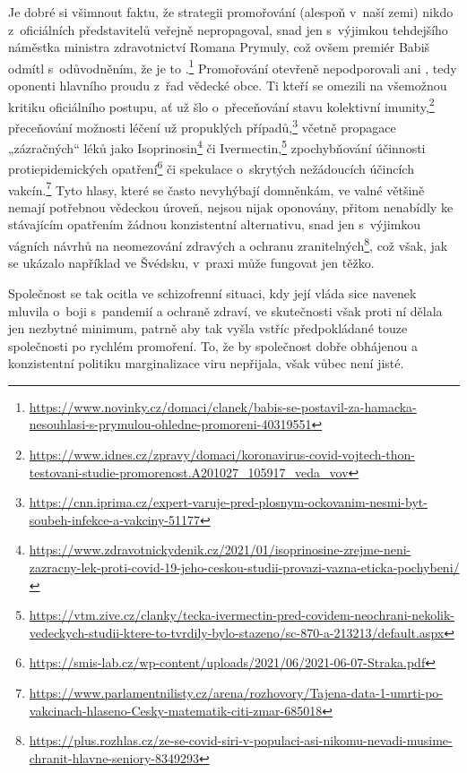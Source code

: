 Je dobré si všimnout faktu, že strategii promořování (alespoň v~naší zemi) nikdo z~oficiálních představitelů veřejně nepropagoval, snad jen s~výjimkou tehdejšího náměstka ministra zdravotnictví Romana Prymuly, což ovšem premiér Babiš odmítl s~odůvodněním, že je to .\footnote{\url{https://www.novinky.cz/domaci/clanek/babis-se-postavil-za-hamacka-nesouhlasi-s-prymulou-ohledne-promoreni-40319551}} Promořování otevřeně nepodporovali ani , tedy oponenti hlavního proudu z~řad vědecké obce. Ti kteří se omezili na všemožnou kritiku oficiálního postupu, ať už šlo o~přeceňování stavu kolektivní imunity,\footnote{\url{https://www.idnes.cz/zpravy/domaci/koronavirus-covid-vojtech-thon-testovani-studie-promorenost.A201027_105917_veda_vov}} přeceňování možnosti léčení už propuklých případů,\footnote{\url{https://cnn.iprima.cz/expert-varuje-pred-plosnym-ockovanim-nesmi-byt-soubeh-infekce-a-vakciny-51177}} včetně propagace „zázračných“ léků jako Isoprinosin\footnote{\url{https://www.zdravotnickydenik.cz/2021/01/isoprinosine-zrejme-neni-zazracny-lek-proti-covid-19-jeho-ceskou-studii-provazi-vazna-eticka-pochybeni/}} či Ivermectin,\footnote{\url{https://vtm.zive.cz/clanky/tecka-ivermectin-pred-covidem-neochrani-nekolik-vedeckych-studii-ktere-to-tvrdily-bylo-stazeno/sc-870-a-213213/default.aspx}} zpochybňování účinnosti protiepidemických opatření\footnote{\url{https://smis-lab.cz/wp-content/uploads/2021/06/2021-06-07-Straka.pdf}} či spekulace o~skrytých nežádoucích účincích vakcín.\footnote{\url{https://www.parlamentnilisty.cz/arena/rozhovory/Tajena-data-1-umrti-po-vakcinach-hlaseno-Cesky-matematik-citi-zmar-685018}} Tyto  hlasy, které se často nevyhýbají domněnkám, ve valné většině nemají potřebnou vědeckou úroveň, nejsou nijak oponovány, přitom nenabídly ke stávajícím opatřením žádnou konzistentní alternativu, snad jen s~výjimkou vágních návrhů na neomezování zdravých a ochranu zranitelných\footnote{\url{https://plus.rozhlas.cz/ze-se-covid-siri-v-populaci-asi-nikomu-nevadi-musime-chranit-hlavne-seniory-8349293}}, což však, jak se ukázalo například ve Švédsku, v~praxi může fungovat jen těžko. 

Společnost se tak ocitla ve schizofrenní situaci, kdy její vláda sice navenek mluvila o~boji s~pandemií a ochraně zdraví, ve skutečnosti však proti ní dělala jen nezbytné minimum, patrně aby tak vyšla vstříc předpokládané touze společnosti po rychlém promoření. To, že by společnost dobře obhájenou a konzistentní politiku marginalizace viru nepřijala, však vůbec není jisté.

